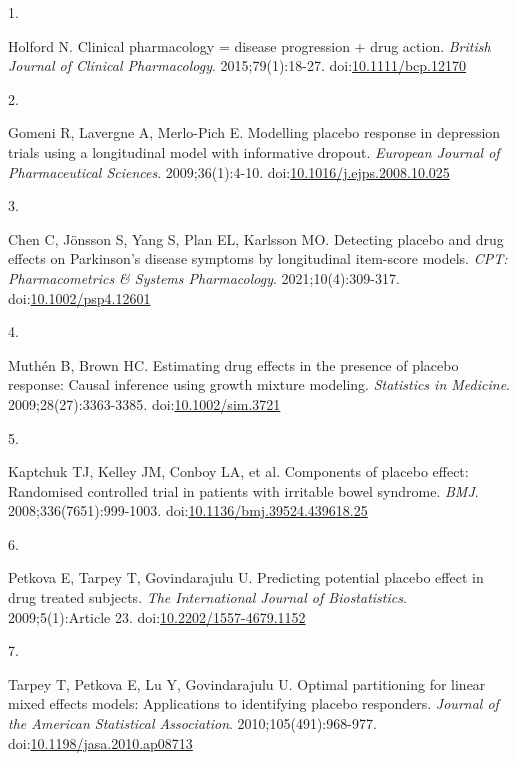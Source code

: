 \documentclass[
  11pt,
]{article}
\newlength{\cslhangindent}
\newlength{\csllabelwidth}
\newenvironment{CSLReferences}[2] %
 {\begin{list}{}{%
  \setlength{\itemindent}{0pt}
  \setlength{\leftmargin}{0pt}
  \setlength{\parsep}{0pt}
  \ifodd #1
   \setlength{\leftmargin}{\cslhangindent}
   \setlength{\itemindent}{-1\cslhangindent}
  \fi
  \setlength{\itemsep}{#2\baselineskip}}}
 {\end{list}}
\newcommand{\CSLLeftMargin}[1]{\parbox[t]{\csllabelwidth}{\strut#1\strut}}
\newcommand{\CSLRightInline}[1]{\parbox[t]{\linewidth - \csllabelwidth}{\strut#1\strut}}
\begin{document}
\protect{}\label{refs}
\begin{CSLReferences}{0}{1}
\CSLLeftMargin{1. }%
\CSLRightInline{Holford N. Clinical pharmacology = disease progression + drug action. \emph{British Journal of Clinical Pharmacology}. 2015;79(1):18-27. doi:\href{https://doi.org/10.1111/bcp.12170}{10.1111/bcp.12170}}

\CSLLeftMargin{2. }%
\CSLRightInline{Gomeni R, Lavergne A, Merlo-Pich E. Modelling placebo response in depression trials using a longitudinal model with informative dropout. \emph{European Journal of Pharmaceutical Sciences}. 2009;36(1):4-10. doi:\href{https://doi.org/10.1016/j.ejps.2008.10.025}{10.1016/j.ejps.2008.10.025}}

\CSLLeftMargin{3. }%
\CSLRightInline{Chen C, Jönsson S, Yang S, Plan EL, Karlsson MO. Detecting placebo and drug effects on {Parkinson's} disease symptoms by longitudinal item-score models. \emph{CPT: Pharmacometrics \& Systems Pharmacology}. 2021;10(4):309-317. doi:\href{https://doi.org/10.1002/psp4.12601}{10.1002/psp4.12601}}

\CSLLeftMargin{4. }%
\CSLRightInline{Muthén B, Brown HC. Estimating drug effects in the presence of placebo response: Causal inference using growth mixture modeling. \emph{Statistics in Medicine}. 2009;28(27):3363-3385. doi:\href{https://doi.org/10.1002/sim.3721}{10.1002/sim.3721}}

\CSLLeftMargin{5. }%
\CSLRightInline{{Kaptchuk TJ, Kelley JM, Conboy LA, et al.} Components of placebo effect: Randomised controlled trial in patients with irritable bowel syndrome. \emph{BMJ}. 2008;336(7651):999-1003. doi:\href{https://doi.org/10.1136/bmj.39524.439618.25}{10.1136/bmj.39524.439618.25}}

\CSLLeftMargin{6. }%
\CSLRightInline{Petkova E, Tarpey T, Govindarajulu U. Predicting potential placebo effect in drug treated subjects. \emph{The International Journal of Biostatistics}. 2009;5(1):Article 23. doi:\href{https://doi.org/10.2202/1557-4679.1152}{10.2202/1557-4679.1152}}

\CSLLeftMargin{7. }%
\CSLRightInline{Tarpey T, Petkova E, Lu Y, Govindarajulu U. Optimal partitioning for linear mixed effects models: Applications to identifying placebo responders. \emph{Journal of the American Statistical Association}. 2010;105(491):968-977. doi:\href{https://doi.org/10.1198/jasa.2010.ap08713}{10.1198/jasa.2010.ap08713}}


\end{CSLReferences}
\end{document}
